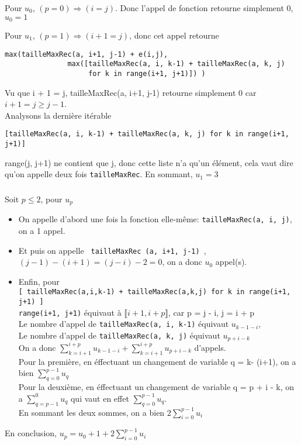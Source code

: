 \documentclass[french]{article}
\begin{document}
\subsubsection{}
Pour $u_{0}$, $(p = 0) \Rightarrow (i = j)$. Donc l'appel de fonction retourne simplement 0, $u_{0}=1$ \par
Pour $u_{1}$, $(p = 1) \Rightarrow (i + 1 = j)$, donc cet appel retourne 
\begin{lstlisting}
max(tailleMaxRec(a, i+1, j-1) + e(i,j),
               max([tailleMaxRec(a, i, k-1) + tailleMaxRec(a, k, j)
                    for k in range(i+1, j+1)]) )\end{lstlisting}
Vu que i + 1 = j,  tailleMaxRec(a, i+1, j-1) retourne simplement 0 car $i+1=j\geq j-1$.\\
Analysons la dernière itérable 
\begin{lstlisting}
[tailleMaxRec(a, i, k-1) + tailleMaxRec(a, k, j) for k in range(i+1, j+1)]\end{lstlisting}
range(j, j+1) ne contient que j, donc cette liste n'a qu'un élément, cela vaut dire qu'on appelle deux fois  \lstinline{tailleMaxRec}.
En sommant, $u_{1} = 3$
\subsubsection{}

Soit $p \leq 2$, pour $u_{p}$\\
	\begin{itemize}
	\item
	On appelle d'abord une fois la fonction elle-même: \lstinline{tailleMaxRec(a, i, j)}, on a 1 appel. 
	\item
	Et puis on appelle  \lstinline{ tailleMaxRec (a, i+1, j-1) },\\
	 $(j-1)-(i+1)=(j-i)-2=0$, on a donc $u_{0}$ appel(s).
	\item
	Enfin, pour\\
 \lstinline{[ tailleMaxRec(a,i,k-1) + tailleMaxRec(a,k,j) for k in range(i+1, j+1) ]}\\
	\lstinline{range(i+1, j+1)} équivaut à $\llbracket i+1, i+p \rrbracket$, car p = j - i, j = i + p\\
Le nombre d'appel de \lstinline{tailleMaxRec(a, i, k-1)} équivaut $u_{k-1-i}$,\\Le nombre d'appel de \lstinline{tailleMaxRec(a, k, j)} équivaut $u_{p+i-k}$\\	
On a donc $\sum_{k=i+1}^{i+p} u_{k-1-i} + \sum_{k=i+1}^{i+p} u_{p+i-k}$ d'appels.\\
Pour la première, en éffectuant un changement de variable q = k- (i+1), on a bien $\sum_{q=0}^{p-1} u_{q}$\\
Pour la deuxième, en éffectuant un changement de variable q = p + i - k, on a  $\sum_{q=p-1}^{0} u_{q}$ qui vaut en effet $\sum_{q=0}^{p-1} u_{q}$.\\
En sommant les deux sommes, on a bien $2\sum_{i=0}^{p-1} u_{i}$
	\end{itemize}
\par
En conclusion, $u_{p}=u_{0}+1+2\sum_{i=0}^{p-1} u_{i}$
\end{document}
